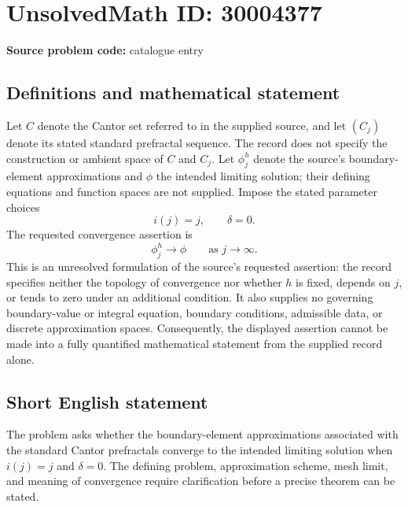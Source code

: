 \documentclass[11pt]{article}
\begin{document}
\section*{UnsolvedMath ID: 30004377}
\textbf{Source problem code:} catalogue entry
\subsection{Definitions and mathematical statement}
Let \(C\) denote the Cantor set referred to in the supplied source, and let \((C_j)\) denote its stated standard prefractal sequence. The record does not specify the construction or ambient space of \(C\) and \(C_j\). Let \(\phi_j^h\) denote the source's boundary-element approximations and \(\phi\) the intended limiting solution; their defining equations and function spaces are not supplied. Impose the stated parameter choices
\[
 i(j)=j,\qquad \delta=0.
\]
The requested convergence assertion is
\[
 \phi_j^h\longrightarrow\phi\qquad\text{as }j\to\infty.
\]
This is an unresolved formulation of the source's requested assertion: the record specifies neither the topology of convergence nor whether \(h\) is fixed, depends on \(j\), or tends to zero under an additional condition. It also supplies no governing boundary-value or integral equation, boundary conditions, admissible data, or discrete approximation spaces. Consequently, the displayed assertion cannot be made into a fully quantified mathematical statement from the supplied record alone.
\subsection{Short English statement}
The problem asks whether the boundary-element approximations associated with the standard Cantor prefractals converge to the intended limiting solution when \(i(j)=j\) and \(\delta=0\). The defining problem, approximation scheme, mesh limit, and meaning of convergence require clarification before a precise theorem can be stated.
\end{document}
